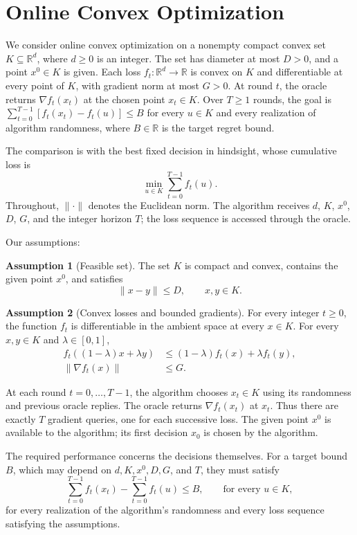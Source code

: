 \documentclass[10pt]{article}
\theoremstyle{definition}
\newtheorem{assumption}{Assumption}
\begin{document}
\section*{Online Convex Optimization}
We consider online convex optimization on a nonempty compact convex set $K\subseteq\mathbb{R}^d$, where $d\geq0$ is an integer. The set has diameter at most $D>0$, and a point $x^0\in K$ is given. Each loss $f_t:\mathbb{R}^d\to\mathbb{R}$ is convex on $K$ and differentiable at every point of $K$, with gradient norm at most $G>0$. At round $t$, the oracle returns $\nabla f_t(x_t)$ at the chosen point $x_t\in K$. Over $T\geq1$ rounds, the goal is $\sum_{t=0}^{T-1}[f_t(x_t)-f_t(u)]\leq B$ for every $u\in K$ and every realization of algorithm randomness, where $B\in\mathbb{R}$ is the target regret bound.

The comparison is with the best fixed decision in hindsight, whose cumulative loss is
\[
\min_{u\in K}\sum_{t=0}^{T-1}f_t(u).
\]
Throughout, $\|\cdot\|$ denotes the Euclidean norm. The algorithm receives $d$, $K$, $x^0$, $D$, $G$, and the integer horizon $T$; the loss sequence is accessed through the oracle.

Our assumptions:
\begin{assumption}[Feasible set]
The set $K$ is compact and convex, contains the given point $x^0$, and satisfies
\[
\|x-y\|\leq D,
\qquad x,y\in K.
\]
\end{assumption}

\begin{assumption}[Convex losses and bounded gradients]
For every integer $t\geq0$, the function $f_t$ is differentiable in the ambient space at every $x\in K$. For every $x,y\in K$ and $\lambda\in[0,1]$,
\[
\begin{aligned}
f_t((1-\lambda)x+\lambda y)
&\leq (1-\lambda)f_t(x)+\lambda f_t(y),\\
\|\nabla f_t(x)\|&\leq G.
\end{aligned}
\]
\end{assumption}

At each round $t=0,\ldots,T-1$, the algorithm chooses $x_t\in K$ using its randomness and previous oracle replies. The oracle returns $\nabla f_t(x_t)$ at $x_t$. Thus there are exactly $T$ gradient queries, one for each successive loss. The given point $x^0$ is available to the algorithm; its first decision $x_0$ is chosen by the algorithm.

The required performance concerns the decisions themselves. For a target bound $B$, which may depend on $d,K,x^0,D,G$, and $T$, they must satisfy
\[
\sum_{t=0}^{T-1}f_t(x_t)
-\sum_{t=0}^{T-1}f_t(u)
\leq B,
\qquad \text{for every }u\in K,
\]
for every realization of the algorithm's randomness and every loss sequence satisfying the assumptions.
\end{document}
